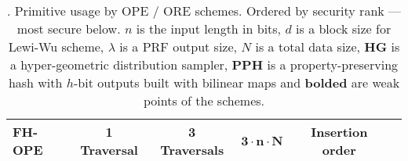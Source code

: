 \begin{frame}[label={frame:appendix:ore}]
\begin{table}
\begin{adjustbox}{width=\linewidth}
\begin{tabular}{ l c c c c c }
					\midrule

					FH-OPE \cite{fh-ope}						& 1 Traversal												& 3 Traversals									& $\bm{3 \cdot n \cdot N}$															& Insertion order													\\

					\bottomrule

				\end{tabular}
			\end{adjustbox}
			\captionsetup{justification=justified}
			\caption{
				\cite[Table 1]{ore-benchmark-17}.
				Primitive usage by OPE / ORE schemes.
				Ordered by security rank --- most secure below.
				$n$ is the input length in bits, $d$ is a block size for Lewi-Wu \cite{lewi-ore} scheme, $\lambda$ is a PRF output size, $N$ is a total data size, \textbf{HG} is a hyper-geometric distribution sampler, \textbf{PPH} is a property-preserving hash with $h$-bit outputs built with bilinear maps and \textbf{bolded} are weak points of the schemes.
			}
		\end{table}

		\begin{flushright}
			\hyperlink{frame:ore}{}
		\end{flushright}

	\end{frame}

